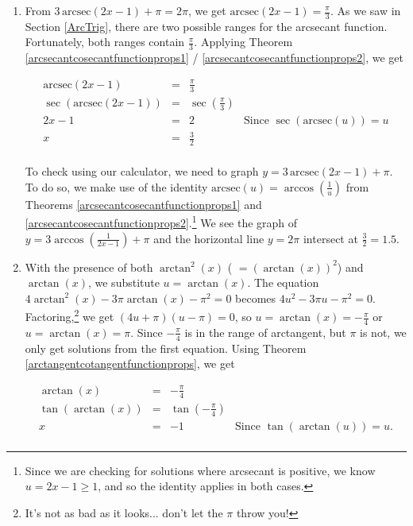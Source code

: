 \begin{ex}
\begin{enumerate}
\begin{center}
\end{center}


\item From $3 \, \text{arcsec}(2x-1) + \pi = 2 \pi$, we get $\text{arcsec}(2x-1) = \frac{\pi}{3}$.  As we saw in Section \ref{ArcTrig}, there are two possible ranges for the arcsecant function.  Fortunately, both ranges contain $\frac{\pi}{3}$.  Applying Theorem \ref{arcsecantcosecantfunctionprops1} / \ref{arcsecantcosecantfunctionprops2}, we get

\[ \begin{array}{rclr}

\text{arcsec}(2x-1)& = & \frac{\pi}{3} & \\ [5pt]
\sec(\text{arcsec}(2x-1)) & = & \sec\left(\frac{\pi}{3}\right) & \\ [5pt]
2x -1 & = & 2 & \text{Since $\sec(\text{arcsec}(u)) = u$} \\ [5pt]
    x & = & \frac{3}{2} \\ \end{array} \]



To check using our calculator, we need to graph $y=3 \, \text{arcsec}(2x-1) + \pi$.  To do so, we make use of the identity $\text{arcsec}(u) = \arccos\left(\frac{1}{u}\right)$ from Theorems \ref{arcsecantcosecantfunctionprops1} and \ref{arcsecantcosecantfunctionprops2}.\footnote{Since we are checking for solutions where arcsecant is positive, we know $u = 2x-1 \geq 1$, and so the identity applies in both cases.} We see the graph of $y=3 \arccos\left(\frac{1}{2x-1}\right) + \pi$ and the horizontal line $y = 2\pi$ intersect at $\frac{3}{2} = 1.5$.

\item  With the presence of both $\arctan^{2}(x)$ ( $= (\arctan(x))^2$) and $\arctan(x)$, we substitute $u = \arctan(x)$.  The equation  $4\arctan^2(x)-3\pi \arctan(x)-\pi^2 = 0$ becomes $4u^2 -3\pi u - \pi^2 = 0$.  Factoring,\footnote{It's not as bad as it looks...  don't let the $\pi$ throw you!} we get $(4u+\pi)(u - \pi) = 0$, so $u = \arctan(x) = -\frac{\pi}{4}$ or $u = \arctan(x) = \pi$.  Since $-\frac{\pi}{4}$ is in the range of arctangent, but $\pi$ is not, we only get solutions from the first equation.  Using Theorem \ref{arctangentcotangentfunctionprops}, we get

\[ \begin{array}{rclr}

\arctan(x) & = & -\frac{\pi}{4} & \\ [5pt]
\tan(\arctan(x)) & = & \tan\left(-\frac{\pi}{4}\right) & \\ [5pt]
x & = & -1 & \text{Since $\tan(\arctan(u)) = u$.} \\ \end{array}\]


\end{enumerate}
\end{ex}
